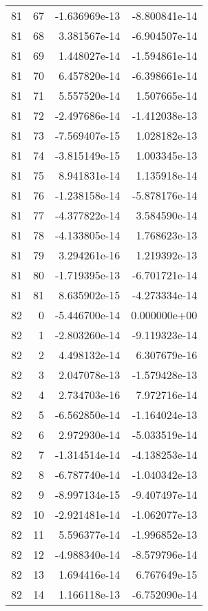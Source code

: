 \begin{tabular}{rrrr}
  81 &   67 & -1.636969e-13 & -8.800841e-14 \\
  81 &   68 &  3.381567e-14 & -6.904507e-14 \\
  81 &   69 &  1.448027e-14 & -1.594861e-14 \\
  81 &   70 &  6.457820e-14 & -6.398661e-14 \\
  81 &   71 &  5.557520e-14 &  1.507665e-14 \\
  81 &   72 & -2.497686e-14 & -1.412038e-13 \\
  81 &   73 & -7.569407e-15 &  1.028182e-13 \\
  81 &   74 & -3.815149e-15 &  1.003345e-13 \\
  81 &   75 &  8.941831e-14 &  1.135918e-14 \\
  81 &   76 & -1.238158e-14 & -5.878176e-14 \\
  81 &   77 & -4.377822e-14 &  3.584590e-14 \\
  81 &   78 & -4.133805e-14 &  1.768623e-13 \\
  81 &   79 &  3.294261e-16 &  1.219392e-13 \\
  81 &   80 & -1.719395e-13 & -6.701721e-14 \\
  81 &   81 &  8.635902e-15 & -4.273334e-14 \\
  82 &    0 & -5.446700e-14 &  0.000000e+00 \\
  82 &    1 & -2.803260e-14 & -9.119323e-14 \\
  82 &    2 &  4.498132e-14 &  6.307679e-16 \\
  82 &    3 &  2.047078e-13 & -1.579428e-13 \\
  82 &    4 &  2.734703e-16 &  7.972716e-14 \\
  82 &    5 & -6.562850e-14 & -1.164024e-13 \\
  82 &    6 &  2.972930e-14 & -5.033519e-14 \\
  82 &    7 & -1.314514e-14 & -4.138253e-14 \\
  82 &    8 & -6.787740e-14 & -1.040342e-13 \\
  82 &    9 & -8.997134e-15 & -9.407497e-14 \\
  82 &   10 & -2.921481e-14 & -1.062077e-13 \\
  82 &   11 &  5.596377e-14 & -1.996852e-13 \\
  82 &   12 & -4.988340e-14 & -8.579796e-14 \\
  82 &   13 &  1.694416e-14 &  6.767649e-15 \\
  82 &   14 &  1.166118e-13 & -6.752090e-14 \\

\end{tabular}
